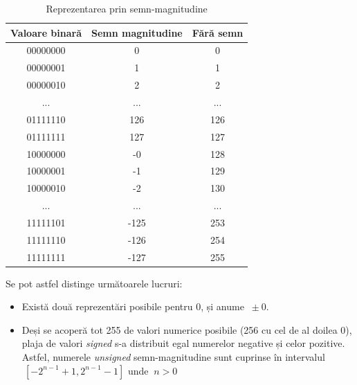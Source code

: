 \documentclass[12pt]{article}
\begin{document}
\begin{table}[h]
\centering
\caption{Reprezentarea prin semn-magnitudine }
\label{Tabela:5}
\begin{tabular}{ ||c|c|c|| }
 \hline
 Valoare binară & Semn magnitudine &  Fără semn\\ 
 \hline  \hline
 00000000 & 0 & 0\\
 \hline
 00000001 & 1  & 1\\
 \hline
 00000010 &  2 & 2 \\
 \hline
  ... &  ... & ... \\
 \hline
 01111110 & 126 & 126 \\
 \hline
 01111111 & 127 & 127 \\
 \hline
 10000000 & -0 & 128 \\
 \hline
 10000001 & -1 & 129 \\
 \hline
 10000010 & -2 & 130 \\
 \hline
   ... &  ... & ... \\
 \hline
  11111101 & -125 & 253 \\
 \hline
 11111110 & -126 & 254 \\
 \hline
 11111111 & -127 & 255 \\
 \hline
\end{tabular}
\end{table}
Se pot astfel distinge următoarele lucruri:
\begin{itemize}
\item Există două reprezentări posibile pentru 0, și anume $\ \pm 0$.
\item Deși se acoperă tot 255 de valori numerice posibile (256 cu cel de al doilea 0), plaja de valori \textit{signed} s-a distribuit egal numerelor negative și celor pozitive. Astfel, numerele \textit{unsigned} semn-magnitudine  sunt cuprinse în intervalul $\ [-2^{n-1}+1, 2^{n-1}-1]$ unde $\ n > 0$ 
\end{itemize}
\end{document}
